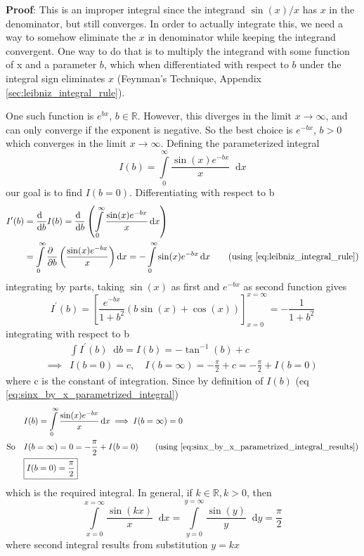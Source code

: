\documentclass[11pt, a4paper]{article}
\newcommand{\eqrefnp}[1]{\textup{\ref{#1}}}
\newcommand{\primed}[1]{#1^{\prime}}
\newcommand{\diff}{\mathop{}\!\mathrm{d}}
\newcommand{\dx}{\diff x}
\newcommand{\dy}{\diff y}
\newcommand{\derv}[1]{\frac{\diff \hfill}{\diff #1}}	%
\newcommand{\dervb}[2]{\derv{#1} \left(#2\right)}  %
\newcommand{\pdiff}{\mathop{}\!\mathrm{\partial}} %
\newcommand{\pderv}[1]{\frac{\pdiff \hfill}{\pdiff #1}}	%
\newcommand{\pdervb}[2]{\pderv{#1} \left(#2\right)}  %
\newcommand{\dint}[2]{\int \limits_{#1}^{#2}}  %
\newcommand{\intzerotoinfty}{\dint{0}{\infty}}	%
\begin{document}
\vspace{4pt}
\textbf{Proof}: \cite{herman2016fourieranalysis} This is an improper integral since the integrand $\sin(x) / x$ has $x$ in the denominator, but still converges. In order to actually integrate this, we need a way to somehow eliminate the $x$ in denominator while keeping the integrand convergent. One way to do that is to multiply the integrand with some function of x and a parameter $b$, which when differentiated with respect to $b$ under the integral sign eliminates $x$ (Feynman's Technique, Appendix \ref{sec:leibniz_integral_rule}).

One such function is $e^{bx}$, $b \in \mathbb{R}$. However, this diverges in the limit $x \to \infty$, and can only converge if the exponent is negative. So the best choice is $e^{-bx}$, $b > 0$ which converges in the limit $x \to \infty$. Defining the parameterized integral
\begin{equation}\label{eq:sinx_by_x_parametrized_integral}
	I(b) = \intzerotoinfty \frac{\sin(x) e^{-bx}}{x} \dx
\end{equation}
our goal is to find $I(b=0)$. Differentiating with respect to b
\begin{align*}
	\primed{I}(b) & = \derv{b}I(b) = \dervb{b}{\intzerotoinfty \frac{\sin(x) e^{-bx}}{x} \dx} \\
	& = \intzerotoinfty \pdervb{b}{\frac{\sin(x) e^{-bx}}{x}} \dx = -\intzerotoinfty \sin(x) e^{-bx} \dx \tag{using \eqrefnp{eq:leibniz_integral_rule}}
\end{align*}
integrating by parts, taking $\sin(x)$ as first and $e^{-bx}$ as second function gives
\begin{equation*}
	\primed{I}(b) = \left[\frac{e^{-bx}}{1 + b^{2}} \left(b\sin(x) + \cos(x)\right)\right]_{x=0}^{x=\infty} = -\frac{1}{1 + b^{2}}
\end{equation*}
integrating with respect to b
\begin{align}
	& \int \primed{I}(b) \diff b = I(b) = -\tan^{-1}(b) + c \nonumber \\
	\implies & I(b=0) = c, \quad I(b=\infty) = -\frac{\pi}{2} + c = -\frac{\pi}{2} + I(b=0) \label{eq:sinx_by_x_parametrized_integral_results}
\end{align}
where c is the constant of integration. Since by definition of $I(b)$ (eq \eqrefnp{eq:sinx_by_x_parametrized_integral})
\begin{align*}
	& I(b) = \intzerotoinfty \frac{\sin(x) e^{-bx}}{x} \dx \implies I(b=\infty) = 0 \\
	\text{So} \quad & I(b=\infty) = 0 = -\frac{\pi}{2} + I(b=0) \tag{using \eqrefnp{eq:sinx_by_x_parametrized_integral_results}} \\
	& \boxed{I(b=0) = \frac{\pi}{2}}
\end{align*}
which is the required integral. In general, if $k \in \mathbb{R}, k > 0$, then
\begin{equation}\label{eq:int_sinkx_by_x}
\int \limits_{x=0}^{x=\infty} \frac{\sin(kx)}{x} \dx = \int \limits_{y=0}^{y=\infty} \frac{\sin(y)}{y} \dy = \frac{\pi}{2}
\end{equation}
where second integral results from substitution $y=kx$
\end{document}
